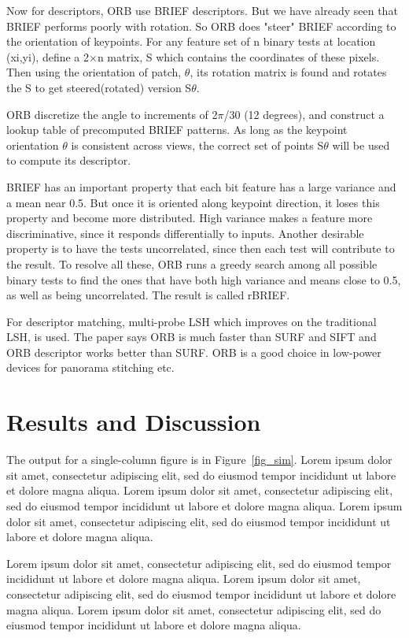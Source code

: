 \documentclass[
  journal=largetwo,
  manuscript=article-type,
  year=2023,
  volume=1,
]{iitp-journal}
\begin{document}
Now for descriptors, ORB use BRIEF descriptors. But we have already seen that BRIEF performs poorly with rotation. So ORB does "steer" BRIEF according to the orientation of keypoints. For any feature set of n binary tests at location (xi,yi), define a 2×n matrix, S which contains the coordinates of these pixels. Then using the orientation of patch, $\theta$, its rotation matrix is found and rotates the S to get steered(rotated) version S$\theta$.

ORB discretize the angle to increments of 2$\pi$/30 (12 degrees), and construct a lookup table of precomputed BRIEF patterns. As long as the keypoint orientation $\theta$ is consistent across views, the correct set of points S$\theta$ will be used to compute its descriptor.

BRIEF has an important property that each bit feature has a large variance and a mean near 0.5. But once it is oriented along keypoint direction, it loses this property and become more distributed. High variance makes a feature more discriminative, since it responds differentially to inputs. Another desirable property is to have the tests uncorrelated, since then each test will contribute to the result. To resolve all these, ORB runs a greedy search among all possible binary tests to find the ones that have both high variance and means close to 0.5, as well as being uncorrelated. The result is called rBRIEF.

For descriptor matching, multi-probe LSH which improves on the traditional LSH, is used. The paper says ORB is much faster than SURF and SIFT and ORB descriptor works better than SURF. ORB is a good choice in low-power devices for panorama stitching etc.

\section{Results and Discussion}

The output for a single-column figure is in Figure~\ref{fig_sim}.  Lorem ipsum dolor sit amet, consectetur adipiscing elit, sed do eiusmod tempor incididunt ut labore et dolore magna aliqua. Lorem ipsum dolor sit amet, consectetur adipiscing elit, sed do eiusmod tempor incididunt ut labore et dolore magna aliqua. Lorem ipsum dolor sit amet, consectetur adipiscing elit, sed do eiusmod tempor incididunt ut labore et dolore magna aliqua. 

Lorem ipsum dolor sit amet, consectetur adipiscing elit, sed do eiusmod tempor incididunt ut labore et dolore magna aliqua. Lorem ipsum dolor sit amet, consectetur adipiscing elit, sed do eiusmod tempor incididunt ut labore et dolore magna aliqua. Lorem ipsum dolor sit amet, consectetur adipiscing elit, sed do eiusmod tempor incididunt ut labore et dolore magna aliqua. 
\end{document}
